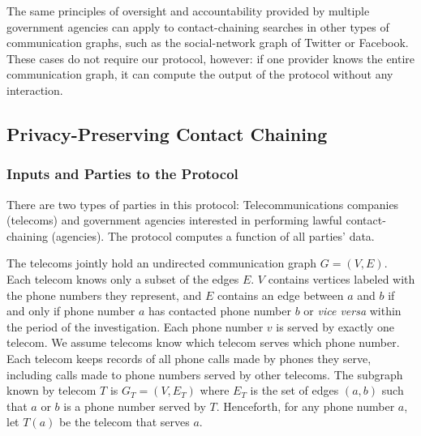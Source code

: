 The same principles of oversight and accountability provided by multiple government agencies can apply to contact-chaining searches in other types of communication graphs, such as the social-network graph of Twitter or Facebook. These cases do not require our protocol, however: if one provider knows the entire communication graph, it can compute the output of the protocol without any interaction.

\subsection{Privacy-Preserving Contact Chaining}

\label{sec-proto}






\subsubsection{Inputs and Parties to the Protocol}



There are two types of parties in this protocol: Telecommunications companies (telecoms) and government agencies interested in performing lawful contact-chaining (agencies). The protocol computes a function of all parties' data.



The telecoms jointly hold an undirected communication graph $G=(V,E)$. Each telecom knows only a subset of the edges $E$. $V$ contains vertices labeled with the phone numbers they represent, and $E$ contains an edge between $a$ and $b$ if and only if phone number $a$ has contacted phone number $b$ or {\it vice versa} within the period of the investigation. Each phone number $v$ is served by exactly one telecom. We assume telecoms know which telecom serves which phone number. Each telecom keeps records of all phone calls made by phones they serve, including calls made to phone numbers served by other telecoms. The subgraph known by telecom $T$ is $G_T=(V, E_T)$ where $E_T$ is the set of edges $(a, b)$ such that $a$ or $b$ is a phone number served by $T$. Henceforth, for any phone number $a$, let $T(a)$ be the telecom that serves $a$.



